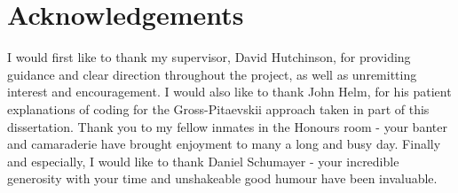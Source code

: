 \documentclass[11pt,final,twoside]{report}
\begin{document}
\chapter*{Acknowledgements}
\thispagestyle{plain}
I would first like to thank my supervisor, David Hutchinson, for providing 
guidance and clear direction throughout the project, as well as unremitting
interest and encouragement. I would also like to thank John Helm, for 
his patient explanations of coding for the Gross-Pitaevskii approach taken 
in part of this dissertation. Thank you to my fellow inmates in the Honours 
room - your banter and camaraderie have brought enjoyment to many a long and 
busy day. Finally and especially, I would like to thank Daniel Schumayer -
your incredible generosity with your time and unshakeable good humour have been
invaluable.

\tableofcontents


\end{document}
